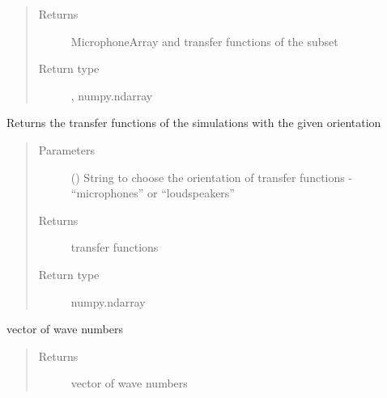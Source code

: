 \documentclass[letterpaper,10pt,english]{sphinxmanual}
\begin{document}
\begin{fulllineitems}
\begin{fulllineitems}
\begin{quote}
\begin{description}
\begin{itemize}
\end{itemize}

\item[{Returns}] \leavevmode
MicrophoneArray and transfer functions of the subset

\item[{Return type}] \leavevmode
{\hyperref[\detokenize{source/pyzones:pyzones.MicrophoneArray}]{}}, numpy.ndarray

\end{description}\end{quote}

\end{fulllineitems}


\begin{fulllineitems}
\label{\detokenize{source/pyzones:pyzones.Simulation.get_transfer_functions}}
Returns the transfer functions of the simulations with the given orientation
\begin{quote}\begin{description}
\item[{Parameters}] \leavevmode
{} () \textendash{} String to choose the orientation of transfer functions - “microphones” or “loudspeakers”

\item[{Returns}] \leavevmode
transfer functions

\item[{Return type}] \leavevmode
numpy.ndarray

\end{description}\end{quote}

\end{fulllineitems}


\begin{fulllineitems}
\label{\detokenize{source/pyzones:pyzones.Simulation.k}}
vector of wave numbers
\begin{quote}\begin{description}
\item[{Returns}] \leavevmode
vector of wave numbers


\end{description}
\end{quote}
\end{fulllineitems}
\end{fulllineitems}
\end{document}
